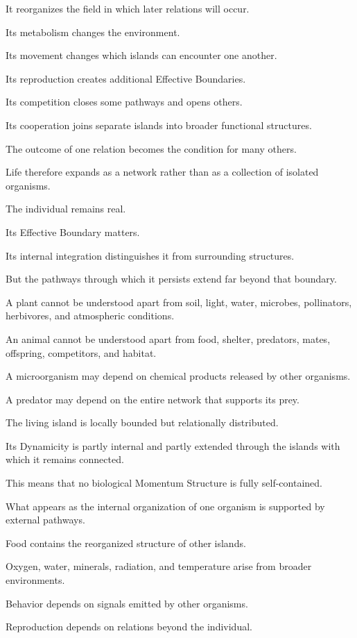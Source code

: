 It reorganizes the field in which later relations will occur.

Its metabolism changes the environment.

Its movement changes which islands can encounter one another.

Its reproduction creates additional Effective Boundaries.

Its competition closes some pathways and opens others.

Its cooperation joins separate islands into broader functional structures.

The outcome of one relation becomes the condition for many others.

Life therefore expands as a network rather than as a collection of isolated organisms.

The individual remains real.

Its Effective Boundary matters.

Its internal integration distinguishes it from surrounding structures.

But the pathways through which it persists extend far beyond that boundary.

A plant cannot be understood apart from soil, light, water, microbes, pollinators, herbivores, and atmospheric conditions.

An animal cannot be understood apart from food, shelter, predators, mates, offspring, competitors, and habitat.

A microorganism may depend on chemical products released by other organisms.

A predator may depend on the entire network that supports its prey.

The living island is locally bounded but relationally distributed.

Its Dynamicity is partly internal and partly extended through the islands with which it remains connected.

This means that no biological Momentum Structure is fully self-contained.

What appears as the internal organization of one organism is supported by external pathways.

Food contains the reorganized structure of other islands.

Oxygen, water, minerals, radiation, and temperature arise from broader environments.

Behavior depends on signals emitted by other organisms.

Reproduction depends on relations beyond the individual.


